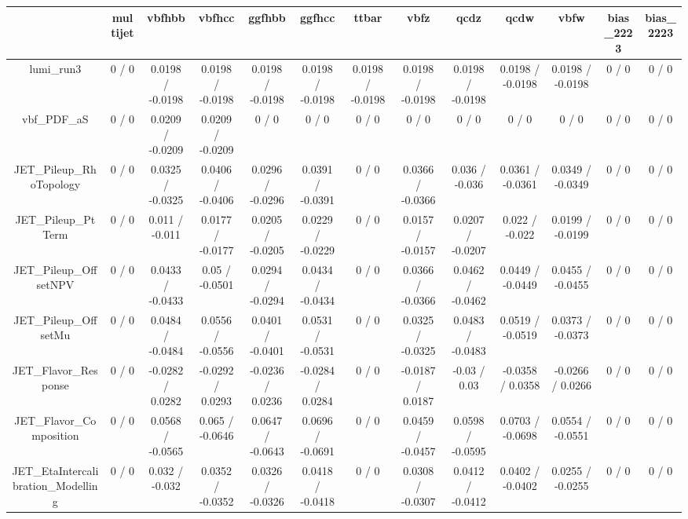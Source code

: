 \documentclass[10pt]{article}
\begin{document}
\begin{table}[htbp]
\begin{center}
\begin{tabular}{|c|c|c|c|c|c|c|c|c|c|c|c|c|}
\hline 
      & multijet      & vbfhbb      & vbfhcc      & ggfhbb      & ggfhcc      & ttbar      & vbfz      & qcdz      & qcdw      & vbfw      & bias_2223      & bias_2223 \\ 
\hline 
  lumi_run3 & 0 / 0 & 0.0198 / -0.0198 & 0.0198 / -0.0198 & 0.0198 / -0.0198 & 0.0198 / -0.0198 & 0.0198 / -0.0198 & 0.0198 / -0.0198 & 0.0198 / -0.0198 & 0.0198 / -0.0198 & 0.0198 / -0.0198 & 0 / 0 & 0 / 0 \\ 
  vbf_PDF_aS & 0 / 0 & 0.0209 / -0.0209 & 0.0209 / -0.0209 & 0 / 0 & 0 / 0 & 0 / 0 & 0 / 0 & 0 / 0 & 0 / 0 & 0 / 0 & 0 / 0 & 0 / 0 \\ 
  JET_Pileup_RhoTopology & 0 / 0 & 0.0325 / -0.0325 & 0.0406 / -0.0406 & 0.0296 / -0.0296 & 0.0391 / -0.0391 & 0 / 0 & 0.0366 / -0.0366 & 0.036 / -0.036 & 0.0361 / -0.0361 & 0.0349 / -0.0349 & 0 / 0 & 0 / 0 \\ 
  JET_Pileup_PtTerm & 0 / 0 & 0.011 / -0.011 & 0.0177 / -0.0177 & 0.0205 / -0.0205 & 0.0229 / -0.0229 & 0 / 0 & 0.0157 / -0.0157 & 0.0207 / -0.0207 & 0.022 / -0.022 & 0.0199 / -0.0199 & 0 / 0 & 0 / 0 \\ 
  JET_Pileup_OffsetNPV & 0 / 0 & 0.0433 / -0.0433 & 0.05 / -0.0501 & 0.0294 / -0.0294 & 0.0434 / -0.0434 & 0 / 0 & 0.0366 / -0.0366 & 0.0462 / -0.0462 & 0.0449 / -0.0449 & 0.0455 / -0.0455 & 0 / 0 & 0 / 0 \\ 
  JET_Pileup_OffsetMu & 0 / 0 & 0.0484 / -0.0484 & 0.0556 / -0.0556 & 0.0401 / -0.0401 & 0.0531 / -0.0531 & 0 / 0 & 0.0325 / -0.0325 & 0.0483 / -0.0483 & 0.0519 / -0.0519 & 0.0373 / -0.0373 & 0 / 0 & 0 / 0 \\ 
  JET_Flavor_Response & 0 / 0 & -0.0282 / 0.0282 & -0.0292 / 0.0293 & -0.0236 / 0.0236 & -0.0284 / 0.0284 & 0 / 0 & -0.0187 / 0.0187 & -0.03 / 0.03 & -0.0358 / 0.0358 & -0.0266 / 0.0266 & 0 / 0 & 0 / 0 \\ 
  JET_Flavor_Composition & 0 / 0 & 0.0568 / -0.0565 & 0.065 / -0.0646 & 0.0647 / -0.0643 & 0.0696 / -0.0691 & 0 / 0 & 0.0459 / -0.0457 & 0.0598 / -0.0595 & 0.0703 / -0.0698 & 0.0554 / -0.0551 & 0 / 0 & 0 / 0 \\ 
  JET_EtaIntercalibration_Modelling & 0 / 0 & 0.032 / -0.032 & 0.0352 / -0.0352 & 0.0326 / -0.0326 & 0.0418 / -0.0418 & 0 / 0 & 0.0308 / -0.0307 & 0.0412 / -0.0412 & 0.0402 / -0.0402 & 0.0255 / -0.0255 & 0 / 0 & 0 / 0 \\ 

\end{tabular}
\end{center}
\end{table}
\end{document}

